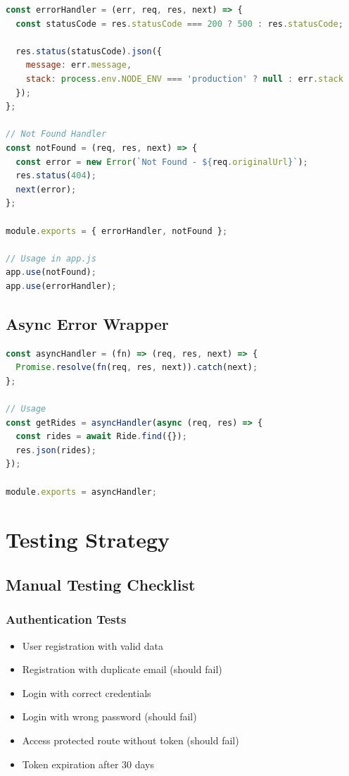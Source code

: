 \documentclass[12pt,a4paper]{article}
\begin{document}
\begin{lstlisting}[language=JavaScript, caption=Global Error Handling Middleware]
const errorHandler = (err, req, res, next) => {
  const statusCode = res.statusCode === 200 ? 500 : res.statusCode;
  
  res.status(statusCode).json({
    message: err.message,
    stack: process.env.NODE_ENV === 'production' ? null : err.stack
  });
};

// Not Found Handler
const notFound = (req, res, next) => {
  const error = new Error(`Not Found - ${req.originalUrl}`);
  res.status(404);
  next(error);
};

module.exports = { errorHandler, notFound };

// Usage in app.js
app.use(notFound);
app.use(errorHandler);
\end{lstlisting}

\subsection{Async Error Wrapper}

\begin{lstlisting}[language=JavaScript, caption=Async Handler Utility]
const asyncHandler = (fn) => (req, res, next) => {
  Promise.resolve(fn(req, res, next)).catch(next);
};

// Usage
const getRides = asyncHandler(async (req, res) => {
  const rides = await Ride.find({});
  res.json(rides);
});

module.exports = asyncHandler;
\end{lstlisting}

\newpage

\section{Testing Strategy}

\subsection{Manual Testing Checklist}

\subsubsection{Authentication Tests}
\begin{itemize}
    \item[$\square$] User registration with valid data
    \item[$\square$] Registration with duplicate email (should fail)
    \item[$\square$] Login with correct credentials
    \item[$\square$] Login with wrong password (should fail)
    \item[$\square$] Access protected route without token (should fail)
    \item[$\square$] Token expiration after 30 days
\end{itemize}
\end{document}
